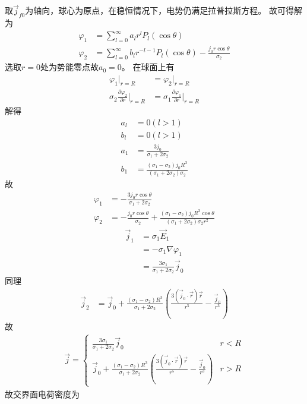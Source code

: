 \documentclass{phyasgn}
\begin{document}
\begin{sol}[6]
  取$\vec{j}_{f0}$为轴向，球心为原点，在稳恒情况下，电势仍满足拉普拉斯方程。
  故可得解为
  \begin{align*}
    \varphi_1&=\sum_{l=0}^{\infty}a_lr^lP_l(\cos\theta)\\
    \varphi_2&=\sum_{l=0}^{\infty}b_lr^{-l-1}P_l(\cos\theta)-\frac{j_0r\cos\theta}{\sigma_2}
  \end{align*}
  选取$r=0$处为势能零点故$a_0=0$。
  在球面上有
  \begin{align*}
    \varphi_1|_{r=R}&=\varphi_2|_{r=R}\\
    \sigma_2\frac{\partial\varphi_2}{\partial r}|_{r=R}&=\sigma_1\frac{\partial\varphi_1}{\partial r}|_{r=R}
  \end{align*}
  解得
  \begin{align*}
    a_l&=0(l>1)\\
    b_l&=0(l>1)\\
    a_1&=\frac{3j_0}{\sigma_1+2\sigma_2}\\
    b_1&=\frac{(\sigma_1-\sigma_2)j_0R^3}{(\sigma_1+2\sigma_2)\sigma_2}
  \end{align*}
  故
  \begin{align*}
    \varphi_1&=-\frac{3j_0r\cos\theta}{\sigma_1+2\sigma_2}\\
    \varphi_2&=-\frac{j_0r\cos\theta}{\sigma_2}+\frac{(\sigma_1-\sigma_2)j_0R^3\cos\theta}{(\sigma_1+2\sigma_2)\sigma_2r^2}
  \end{align*}
  \begin{align*}
    \vec{j}_1&=\sigma_1\vec{E}_1\\
    &=-\sigma_1\nabla\varphi_1\\
    &=\frac{3\sigma_1}{\sigma_1+2\sigma_2}\vec{j}_0
  \end{align*}
  同理
  \begin{align*}
    \vec{j}_2&=\vec{j}_0+\frac{(\sigma_1-\sigma_2)R^3}{\sigma_1+2\sigma_2}(\frac{3(\vec{j}_0\cdot\vec{r})\vec{r}}{r^5}-\frac{\vec{j}_0}{r^3})
  \end{align*}
  故
  \begin{align*}
    \vec{j}=\left\{\begin{matrix}
      \frac{3\sigma_1}{\sigma_1+2\sigma_2}\vec{j}_0&r<R\\
      \vec{j}_0+\frac{(\sigma_1-\sigma_2)R^3}{\sigma_1+2\sigma_2}(\frac{3(\vec{j}_0\cdot\vec{r})\vec{r}}{r^5}-\frac{\vec{j}_0}{r^3})&r>R
    \end{matrix}\right.
  \end{align*}
  故交界面电荷密度为

\end{sol}
\end{document}
